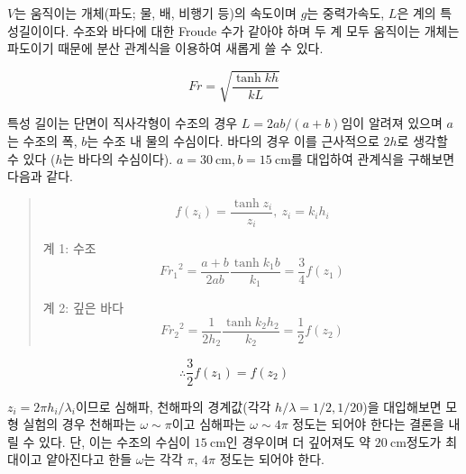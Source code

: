 $V$는 움직이는 개체(파도; 물, 배, 비행기 등)의 속도이며 $g$는 중력가속도, $L$은 계의 특성길이이다. 수조와 바다에 대한 Froude 수가 같아야 하며 두 계 모두 움직이는 개체는 파도이기 때문에 분산 관계식을 이용하여 새롭게 쓸 수 있다.

\begin{equation}
    Fr = \sqrt{\frac{\tanh{kh}}{kL}}
\end{equation}

특성 길이는 단면이 직사각형이 수조의 경우 $L = {2ab}/{(a+b)}$임이 알려져 있으며 $a$는 수조의 폭, $b$는 수조 내 물의 수심이다. 바다의 경우 이를 근사적으로 $2h$로 생각할 수 있다 ($h$는 바다의 수심이다). $a=30\mathrm{~cm}, b=15\mathrm{~cm}$를 대입하여 관계식을 구해보면 다음과 같다.

\begin{quote}
    \[f(z_i) = \frac{\tanh{z_i}}{z_i},~  z_i = k_i h_i\]

    \begin{multicols}{2}

    계 1: 수조
    \[{Fr_1}^{2} = \frac{a+b}{2ab} \frac{\tanh{k_1 b}}{k_1} = \frac{3}{4} f(z_{1})\]

    \columnbreak
    
    계 2: 깊은 바다
    \[{Fr_2}^{2} = \frac{1}{2h_2} \frac{\tanh{k_2 h_2}}{k_2} = \frac{1}{2} f(z_{2})\]
    \end{multicols}

\end{quote}

\begin{equation}
    \therefore \frac{3}{2}f(z_1 ) = f(z_2 )
\end{equation}

$z_i = 2\pi h_i/\lambda_i$이므로 심해파, 천해파의 경계값(각각 $h/\lambda = 1/2, 1/20$)을 대입해보면 모형 실험의 경우 천해파는 $\omega \sim \pi$이고 심해파는 $\omega \sim 4\pi$ 정도는 되어야 한다는 결론을 내릴 수 있다. 단, 이는 수조의 수심이 $15\mathrm{~cm}$인 경우이며 더 깊어져도 약 $20\mathrm{~cm}$정도가 최대이고 얕아진다고 한들 $\omega$는 각각 $\pi$, $4\pi$ 정도는 되어야 한다.




